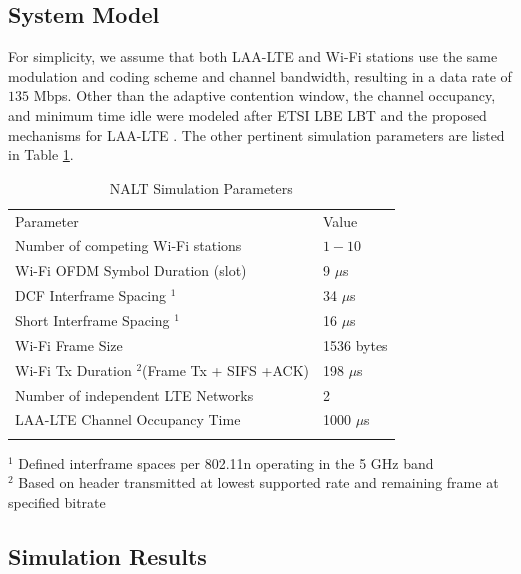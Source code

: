 \subsection{System Model}
\label{sys-model}
For simplicity, we assume that both \mbox{LAA-LTE} and \mbox{Wi-Fi} stations use the same modulation and coding scheme and channel bandwidth, resulting in a data rate of $135$ Mbps.  Other than the adaptive contention window, the channel occupancy, and minimum time idle were modeled after ETSI LBE LBT and the proposed mechanisms for \mbox{LAA-LTE} \cite{3gpp}. The other pertinent simulation parameters are listed in Table \ref{params}.
\begin{table}
	\caption{NALT Simulation Parameters}
	\label{params}      
	\begin{tabular}{p{7cm}p{5cm}}
		\hline\noalign{\smallskip}
		Parameter & Value \\
		\noalign{\smallskip}\svhline\noalign{\smallskip}
		Number of competing \mbox{Wi-Fi} stations& $1 - 10$ \\ 
		Wi-Fi OFDM Symbol Duration (slot) & 9 $\mu$s    \\ 
		DCF Interframe Spacing $^1$ & 34 $\mu$s   \\ 
		Short Interframe Spacing $^1$ & 16 $\mu$s   \\ 
		\mbox{Wi-Fi} Frame Size & 1536 bytes  \\ 
		\mbox{Wi-Fi} Tx Duration $^2$(Frame Tx + SIFS +ACK) & 198 $\mu$s   \\ 
		Number of independent LTE Networks & 2 \\
		\mbox{LAA-LTE} Channel Occupancy Time  & 1000 $\mu$s \\ 	
		\noalign{\smallskip}\hline\noalign{\smallskip}
	\end{tabular}
	$^1$ Defined interframe spaces per 802.11n operating in the 5 GHz band \\
	$^2$ Based on header transmitted at lowest supported rate and remaining frame at specified bitrate	 
\end{table}

\subsection{Simulation Results}
\label{sim-results}

